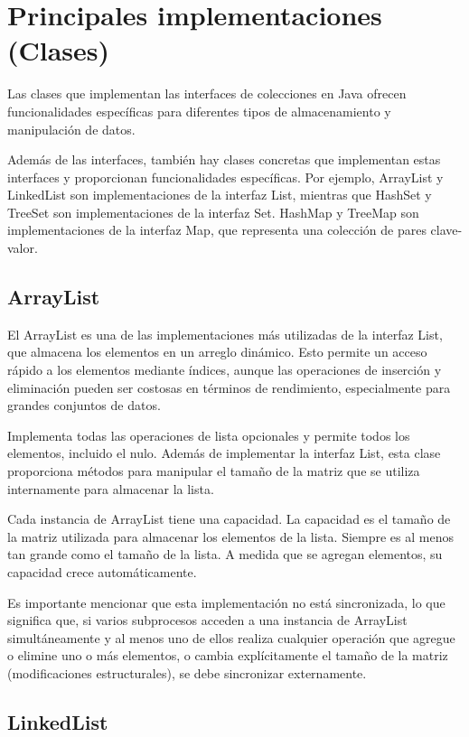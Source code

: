\documentclass[a4paper,12pt]{article}
\begin{document}
\section{Principales implementaciones (Clases)}

Las clases que implementan las interfaces de colecciones en Java ofrecen funcionalidades específicas para diferentes tipos de almacenamiento y manipulación de datos.

Además de las interfaces, también hay clases concretas que implementan estas interfaces y proporcionan funcionalidades específicas. Por ejemplo, ArrayList y LinkedList son implementaciones de la interfaz List, mientras que HashSet y TreeSet son implementaciones de la interfaz Set. HashMap y TreeMap son implementaciones de la interfaz Map, que representa una colección de pares clave-valor.

\subsection{ArrayList}

El ArrayList es una de las implementaciones más utilizadas de la interfaz List, que almacena los elementos en un arreglo dinámico. Esto permite un acceso rápido a los elementos mediante índices, aunque las operaciones de inserción y eliminación pueden ser costosas en términos de rendimiento, especialmente para grandes conjuntos de datos.

Implementa todas las operaciones de lista opcionales y permite todos los elementos, incluido el nulo. Además de implementar la interfaz List, esta clase proporciona métodos para manipular el tamaño de la matriz que se utiliza internamente para almacenar la lista. \cite{array_list}

Cada instancia de ArrayList tiene una capacidad. La capacidad es el tamaño de la matriz utilizada para almacenar los elementos de la lista. Siempre es al menos tan grande como el tamaño de la lista. A medida que se agregan elementos, su capacidad crece automáticamente.  \cite{array_list}

Es importante mencionar que esta implementación no está sincronizada, lo que significa que, si varios subprocesos acceden a una instancia de ArrayList simultáneamente y al menos uno de ellos realiza cualquier operación que agregue o elimine uno o más elementos, o cambia explícitamente el tamaño de la matriz (modificaciones estructurales), se debe sincronizar externamente. \cite{array_list}

\subsection{LinkedList}
\end{document}

